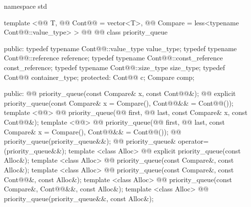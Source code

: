 \documentclass[american,twoside]{book}
\begin{document}
\begin{codeblock}
namespace std {
  template <@@ T, @@ Cont@@ = vector<T>,
       @@ Compare = less<typename Cont@@::value_type> >
  @@
           @@
  class priority_queue {
  public:
    typedef typename Cont@@::value_type            value_type;
    typedef typename Cont@@::reference             reference;
    typedef typename Cont@@::const_reference       const_reference;
    typedef typename Cont@@::size_type             size_type;
    typedef          Cont@@                        container_type;
  protected:
    Cont@@ c;
    Compare comp;

  public:
    @@ priority_queue(const Compare& x, const Cont@@&);
    @@ 
      explicit priority_queue(const Compare& x = Compare(), Cont@@&& = Cont@@());
    template <@@>
      @@
      priority_queue(@@ first, @@ last,
             const Compare& x, const Cont@@&);
    template <@@>
      @@
      priority_queue(@@ first, @@ last,
             const Compare& x = Compare(), Cont@@&& = Cont@@());
    @@ priority_queue(priority_queue&&);
    @@ priority_queue& operator=(priority_queue&&);
    template <class Alloc> 
      @@
      explicit priority_queue(const Alloc&);
    template <class Alloc> 
      @@
      priority_queue(const Compare&, const Alloc&);
    template <class Alloc> 
      @@
      priority_queue(const Compare&, const Cont@@&, const Alloc&);
    template <class Alloc> 
      @@
      priority_queue(const Compare&, Cont@@&&, const Alloc&);
    template <class Alloc> 
      @@
      priority_queue(priority_queue&&, const Alloc&);

}}
\end{codeblock}
\end{document}
